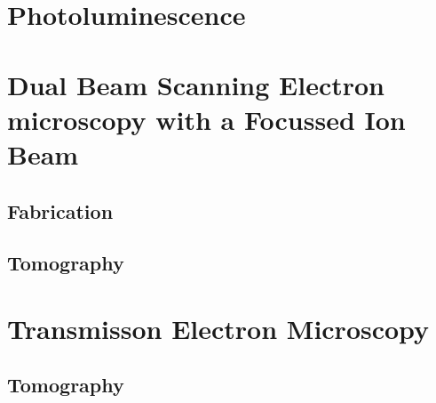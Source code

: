 \section{Photoluminescence}
\section{Dual Beam Scanning Electron microscopy with a Focussed Ion Beam}
\subsection{Fabrication}
\subsection{Tomography}
\section{Transmisson Electron Microscopy}
\subsection{Tomography}


